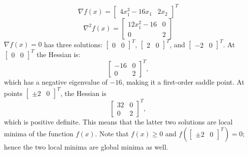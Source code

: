 \documentclass[11pt]{article}
\begin{document}
\subsection{}
$$\nabla f(x)=\begin{bmatrix}4x_1^3-16x_1 & 2x_2\end{bmatrix}^T$$
$$\nabla^2 f(x)=\begin{bmatrix}12x_1^2-16&0\\0&2\end{bmatrix}$$
$\nabla f(x)=0$ has three solutions: $\begin{bmatrix}0&0\end{bmatrix}^T$, $\begin{bmatrix}2&0\end{bmatrix}^T$, and $\begin{bmatrix}-2&0\end{bmatrix}^T$. At $\begin{bmatrix}0&0\end{bmatrix}^T$ the Hessian is:$$\begin{bmatrix}-16&0\\0&2\end{bmatrix}^T,$$ which has a negative eigenvalue of $-16$, making it a first-order saddle point. At points $\begin{bmatrix}\pm2&0\end{bmatrix}^T$, the Hessian is $$\begin{bmatrix}32&0\\0&2\end{bmatrix}^T,$$ which is positive definite. This means that the latter two solutions are local minima of the function $f(x)$. Note that $f(x)\geq0$ and $f(\begin{bmatrix}\pm2&0\end{bmatrix}^T)=0$; hence the two local minima are global minima as well.
\end{document}

